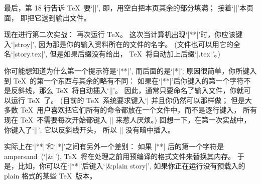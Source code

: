 最后，第 18 行告诉 \TeX\ 要`|\vfill|', 即，用空白把本页其余的部分填满；
接着`|\eject|'本页\hbox{面，} 即把它送到输出文件。

\smallskip 现在进行第二次实战：
再次运行 \TeX。%
这次当计算机出现`|**|'时，你应该键入`|stroy|',
因为那是你的输入资料所在的文件的名字。%
(文件也可以用它的全名`|story.tex|', 但是如果后缀没有给出，
\TeX\ 将自动加上后缀`|.tex|'。)

你可能想知道为什么第一个提示符是`|**|', 而后面的是`|*|';
原因很简单，你所键入到 \TeX\ 的第一个东西与其余的略有不同：
如果在`|**|'后你键入的第一个字符不是反斜线，那么 \TeX\ 将自动插入`||'。%
因此，通常只要命名了输入文件，你就可以运行 \TeX\ 了。%
(目前的 \TeX\ 系统要求键入`|
并且你仍然可以那样做；
但是大多数 \TeX\ 用户喜欢把它们所有的命令都放在一个文件中，而不是逐行键入，
所有现在 \TeX\ 不需要每次开始都键入 || 来惹人厌烦。)
回想一下，在第一次实战中，你键入了`|\relax|', 它以反斜线开头，
所以 || 没有暗中插入。

\danger 实际上在`|**|'和`|*|'之间有另外一个差别：
如果 |**| 后的第一个字符是 ampersand~(\thinspace`|&|'\thinspace),
\TeX\ 将在处理之前用预编译的格式文件来替换其内存。%
于是，比如，你可以在`|**|'后键入`|&plain  story|',
如果你正在运行没有预载入的 plain 格式的某些 \TeX\ 版本。

